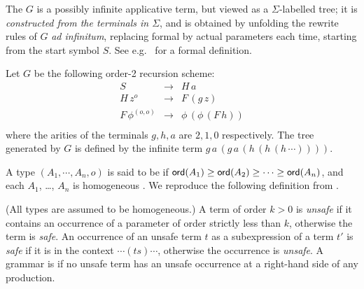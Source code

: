 The  $G$ is a possibly
infinite applicative term, but viewed as a $\Sigma$-labelled tree;
it is \emph{constructed from the terminals in $\Sigma$}, and is obtained by
unfolding the rewrite rules of $G$ \emph{ad infinitum}, replacing
formal by actual parameters each time, starting from the start symbol
$S$. See e.g.~\cite{KNU02} for a formal definition.

\begin{example}\rm\label{eg:running}
  Let $G$ be the following order-2 recursion scheme:
\[\begin{array}{rll}
  S & \rightarrow & H \, a\\
  H \, z^o & \rightarrow & F \, (g \,
  z)\\
  F \, \phi^{(o, o)} & \rightarrow & \phi \, (\phi \, (F \, h))\\
\end{array}\]
where the arities of the terminals $g, h, a$ are $2, 1, 0$ respectively.
The tree generated by $G$ is defined by the infinite term $g \, a \, (g \, a \, (h \, (h \, (h \,
\cdots))))$.%

\end{example}

A type $(A_1, \cdots, A_n, o)$ is said to be  if
${\sf ord}(A_1) \geq {\sf ord}(A_2)\geq \cdots \geq {\sf ord}(A_n)$, and each $A_1$,
\ldots, $A_n$ is homogeneous \cite{KNU02}.  We reproduce the following
definition from \cite{KNU02}.

\begin{definition}\rm
  (All types are assumed to be homogeneous.) A term of order $k > 0$
  is \emph{unsafe} if it contains an occurrence of a parameter of
  order strictly less than $k$, otherwise the term is \emph{safe}. An
  occurrence of an unsafe term $t$ as a subexpression of a term $t'$
  is \emph{safe} if it is in the context $\cdots (ts) \cdots$,
  otherwise the occurrence is \emph{unsafe}. A grammar is
   if no unsafe term has an unsafe occurrence at a
  right-hand side of any production.
\end{definition}

